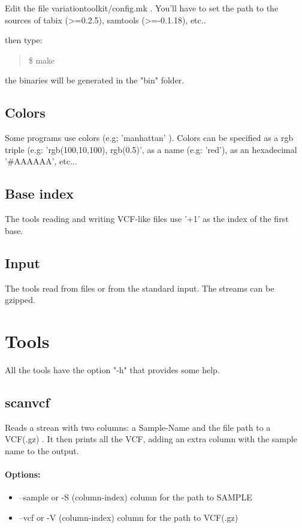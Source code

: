 \documentclass[12pt]{article}
\begin{document}
Edit the file variationtoolkit/config.mk . You'll have to set the path to the sources of tabix (>=0.2.5), samtools (>=-0.1.18), etc..

then type:
\begin{quote}
\$ make
\end{quote}
the binaries will be generated in the "bin" folder.

\subsection{Colors}
Some programs use colors (e.g; 'manhattan' ). Colors can be specified as a rgb triple (e.g: 'rgb(100,10,100), rgb(0.5)', as a name (e.g: 'red'), as an hexadecimal '\#AAAAAA', etc...
\subsection{Base index}
The tools reading and writing VCF-like files use '+1' as the index of the first base.
\subsection{Input}
The tools read from files or from the standard input. The streams can be gzipped.

\section{Tools}
All the tools have the option "-h" that provides some help.


\subsection{scanvcf}
Reads a strean with two columns: a Sample-Name and the file path to a VCF(.gz) . It then prints all the VCF, adding an extra column with the sample name to the output.

\paragraph{Options:}
\begin{itemize}
\item--sample or -S (column-index) column for the path to SAMPLE 
\item--vcf or -V (column-index) column for the path to VCF(.gz)
\end{itemize}
\end{document}
